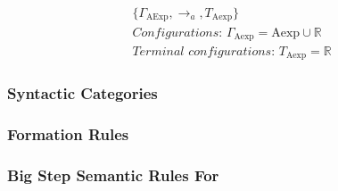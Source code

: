 \begin{figure}
	\begin{gather*} 
		\{ \Gamma_\text{AExp}, \rightarrow_a, T_\text{Aexp} \} \\ 
		\textit{Configurations: } \Gamma_\text{Aexp} = \text{Aexp} \cup \mathbb{R} \\ 
		\textit{Terminal configurations: } T_\text{Aexp} = \mathbb{R}
	\end{gather*} 
	\label{fig:TS_}
\end{figure}

\subsubsection*{Syntactic Categories}
\subsubsection*{Formation Rules}
\subsubsection*{Big Step Semantic Rules For \dazel{}}
